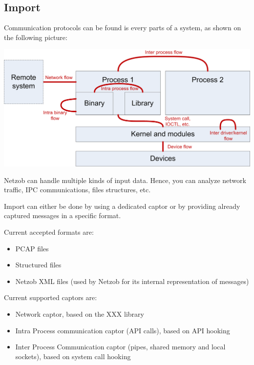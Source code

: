 \documentclass[letterpaper,10pt,english]{sphinxmanual}
\begin{document}
\subsection{Import}
\label{import/index:import}\label{import/index::doc}\label{import/index:id1}
Communication protocols can be found is every parts of a system, as shown on the following picture:

\includegraphics{netzob_comprot.png}

Netzob can handle multiple kinds of input data. Hence, you can analyze network traffic, IPC communications, files structures, etc.

Import can either be done by using a dedicated captor or by providing already captured messages in a specific format.

Current accepted formats are:
\begin{itemize}
\item {} 
PCAP files

\item {} 
Structured files

\item {} 
Netzob XML files (used by Netzob for its internal representation of messages)

\end{itemize}

Current supported captors are:
\begin{itemize}
\item {} 
Network captor, based on the XXX library

\item {} 
Intra Process communication captor (API calls), based on API hooking

\item {} 
Inter Process Communication captor (pipes, shared memory and local sockets), based on system call hooking

\end{itemize}
\end{document}
